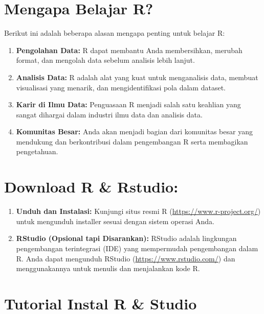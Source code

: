 \documentclass[
]{book}
\providecommand{\tightlist}{%
  \setlength{\itemsep}{0pt}\setlength{\parskip}{0pt}}
\begin{document}
\hypertarget{mengapa-belajar-r}{%
\section{Mengapa Belajar R?}\label{mengapa-belajar-r}}

Berikut ini adalah beberapa alasan mengapa penting untuk belajar R:

\begin{enumerate}
\def\labelenumi{\arabic{enumi}.}
\tightlist
\item
  \textbf{Pengolahan Data:} R dapat membantu Anda membersihkan, merubah format, dan mengolah data sebelum analisis lebih lanjut.
\item
  \textbf{Analisis Data:} R adalah alat yang kuat untuk menganalisis data, membuat visualisasi yang menarik, dan mengidentifikasi pola dalam dataset.
\item
  \textbf{Karir di Ilmu Data:} Penguasaan R menjadi salah satu keahlian yang sangat dihargai dalam industri ilmu data dan analisis data.
\item
  \textbf{Komunitas Besar:} Anda akan menjadi bagian dari komunitas besar yang mendukung dan berkontribusi dalam pengembangan R serta membagikan pengetahuan.
\end{enumerate}

\hypertarget{download-r-rstudio}{%
\section{Download R \& Rstudio:}\label{download-r-rstudio}}

\begin{enumerate}
\def\labelenumi{\arabic{enumi}.}
\tightlist
\item
  \textbf{Unduh dan Instalasi:} Kunjungi situs resmi R (\url{https://www.r-project.org/}) untuk mengunduh installer sesuai dengan sistem operasi Anda.
\item
  \textbf{RStudio (Opsional tapi Disarankan):} RStudio adalah lingkungan pengembangan terintegrasi (IDE) yang mempermudah pengembangan dalam R. Anda dapat mengunduh RStudio (\url{https://www.rstudio.com/}) dan menggunakannya untuk menulis dan menjalankan kode R.
\end{enumerate}

\hypertarget{tutorial-instal-r-studio}{%
\section{Tutorial Instal R \& Studio}\label{tutorial-instal-r-studio}}
\end{document}
